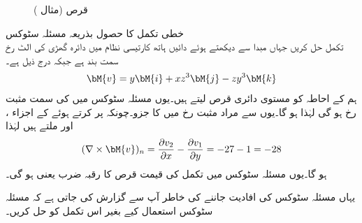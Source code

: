 % 
\begin{figure}
\centering
{}
\caption{قرص (مثال )}
\label{شکل_مثال_خطی_تکمل_گردش_مفہوم}
\end{figure}
\quad خطی تکمل کا حصول بذریعہ مسئلہ سٹوکس\\
تکمل  حل کریں جہاں مبدا سے دیکھتے ہوئے  دائیں ہاتھ کارتیسی نظام میں دائرہ   گھڑی کی الٹ رخ سمت بند ہے جبکہ  درج ذیل ہے۔
\begin{align*}
\bM{v}=y\bM{i}+xz^3\bM{j}-zy^3\bM{k}
\end{align*}
ہم  کے احاطہ  کو مستوی دائری قرص  لیتے ہیں۔یوں مسئلہ سٹوکس میں  کی سمت مثبت  رخ ہو گی لہٰذا  ہو گا۔یوں  سے مراد مثبت  رخ میں  کا جزو۔چونکہ  پر کرتے ہوئے  کے اجزاء ،  اور  ملتے ہیں لہٰذا
\begin{align*}
(\nabla \times \bM{v})_n=\frac{\partial v_2}{\partial x}-\frac{\partial v_1}{\partial y}=-27-1=-28
\end{align*}
ہو گا۔یوں مسئلہ سٹوکس میں تکمل  کی قیمت قرص کا رقبہ   ضرب   یعنی  ہو گی۔

یہاں مسئلہ سٹوکس کی افادیت جاننے کی خاطر آپ سے گزارش کی جاتی ہے کہ مسئلہ سٹوکس استعمال کیے بغیر اس تکمل کو حل کریں۔


